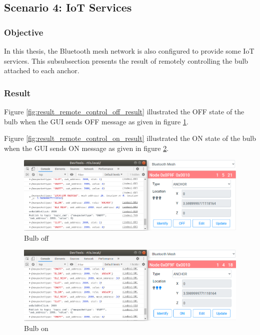 \documentclass[\main/main.tex]{subfiles}
\begin{document}
\subsection{Scenario 4: IoT Services}
\subsubsection{Objective}
In this thesis, the Bluetooth mesh network is also configured to provide some IoT services. This subsubsection presents the result of remotely controlling the bulb attached to each anchor.
\subsubsection{Result}

Figure \ref{fig:result_remote_control_off_result} illustrated the OFF state of the bulb when the GUI sends OFF message as given in figure \ref{fig:result_remote_control_off_gui}.

Figure \ref{fig:result_remote_control_on_result} illustrated the ON state of the bulb when the GUI sends ON message as given in figure \ref{fig:result_remote_control_on_gui}.

\begin{figure}[H]
    \centering
    \includegraphics[width=1\textwidth]{result_remote_control_off_gui.png}
    \caption{Bulb off}
    \label{fig:result_remote_control_off_gui}
\end{figure}

\begin{figure}[H]
    \centering
    \includegraphics[width=1\textwidth]{result_remote_control_on_gui.png}
    \caption{Bulb on}
    \label{fig:result_remote_control_on_gui}
\end{figure}
\end{document}
